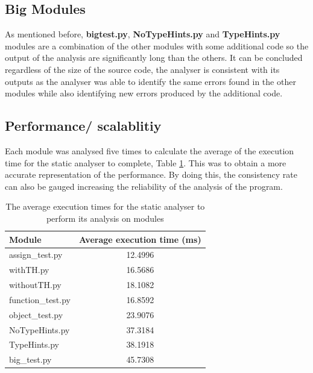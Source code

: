 \documentclass{l4proj}
\begin{document}
\subsection{Big Modules}
As mentioned before, \textbf{big\textunderscore test.py}, \textbf{NoTypeHints.py} and \textbf{TypeHints.py} modules are a combination of the other modules with some additional code so the output of the analysis are significantly long than the others. It can be concluded regardless of the size of the source code, the analyser is consistent with its outputs as the analyser was able to identify the same errors found in the other modules while also identifying new errors produced by the additional code.

\subsection{Performance/ scalablitiy}
Each module was analysed five times to calculate the average of the execution time for the static analyser to complete, Table \ref{tab:exe}. This was to obtain a more accurate representation of the performance. By doing this, the consistency rate can also be gauged increasing the reliability of the analysis of the program.

\begin{table}[h]
\centering
\begin{tabular}{|l|c|}
\hline
Module            & Average execution time (ms) \\ \hline
assign\_test.py   & 12.4996                  \\ \hline
withTH.py         & 16.5686                  \\ \hline
withoutTH.py      & 18.1082                  \\ \hline
function\_test.py & 16.8592                  \\ \hline
object\_test.py   & 23.9076                  \\ \hline
NoTypeHints.py    & 37.3184                  \\ \hline
TypeHints.py      & 38.1918                  \\ \hline
big\_test.py      & 45.7308                  \\ \hline
\end{tabular}
    \caption{The average execution times for the static analyser to perform its analysis on modules}
\label{tab:exe}
\end{table}
\end{document}
